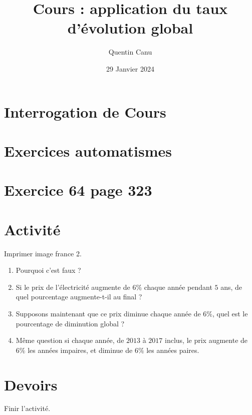 \documentclass{article}
\title{Cours : application du taux d'évolution global}
\date{29 Janvier 2024}
\author{Quentin Canu}
\begin{document}
\maketitle
\section{Interrogation de Cours}
\section{Exercices automatismes}
\section{Exercice 64 page 323}
\section{Activité}
Imprimer image france 2.
\begin{enumerate}
\item Pourquoi c'est faux ? 
\item Si le prix de l'électricité augmente de $6\%$ chaque année pendant $5$ ans, de quel pourcentage augmente-t-il au final ?
\item Supposons maintenant que ce prix diminue chaque année de $6\%$, quel est le pourcentage de diminution global ?
\item Même question si chaque année, de $2013$ à $2017$ inclus, le prix augmente de $6\%$ les années impaires, et diminue de $6\%$ les années paires.
\end{enumerate}
\section{Devoirs}
Finir l'activité.
\end{document}
